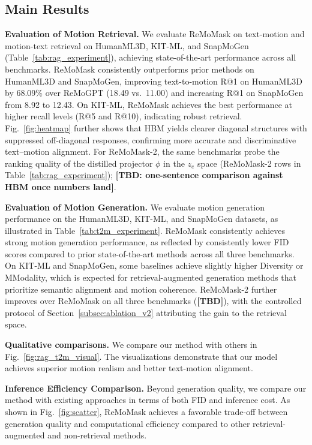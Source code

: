 \documentclass[10pt,journal,compsoc]{IEEEtran}
\newcommand{\myparagraph}[1]{\textbf{#1}\hspace{1.8ex}}
\begin{document}
\subsection{Main Results}
\noindent \myparagraph{Evaluation of Motion Retrieval.}
We evaluate ReMoMask on text-motion and motion-text retrieval on HumanML3D, KIT-ML, and SnapMoGen (Table~\ref{tab:rag_experiment}), achieving state-of-the-art performance across all benchmarks.
ReMoMask consistently outperforms prior methods on HumanML3D and SnapMoGen, improving text-to-motion R@1 on HumanML3D by 68.09\% over ReMoGPT (18.49 vs.~11.00) and increasing R@1 on SnapMoGen from 8.92 to 12.43. On KIT-ML, ReMoMask achieves the best performance at higher recall levels (R@5 and R@10), indicating robust retrieval.
Fig.~\ref{fig:heatmap} further shows that HBM yields clearer diagonal structures with suppressed off-diagonal responses, confirming more accurate and discriminative text–motion alignment.
For ReMoMask-2, the same benchmarks probe the ranking quality of the distilled projector $\phi$ in the $z_e$ space (ReMoMask-2 rows in Table~\ref{tab:rag_experiment}); \textbf{[TBD: one-sentence comparison against HBM once numbers land]}.

\noindent \myparagraph{Evaluation of Motion Generation.}
We evaluate motion generation performance on the HumanML3D, KIT-ML, and SnapMoGen datasets, as illustrated in Table~\ref{tab:t2m_experiment}. ReMoMask consistently achieves strong motion generation performance, as reflected by consistently lower FID scores compared to prior state-of-the-art methods across all three benchmarks. On KIT-ML and SnapMoGen, some baselines achieve slightly higher Diversity or MModality, which is expected for retrieval-augmented generation methods that prioritize semantic alignment and motion coherence.
ReMoMask-2 further improves over ReMoMask on all three benchmarks (\textbf{[TBD]}), with the controlled protocol of Section~\ref{subsec:ablation_v2} attributing the gain to the retrieval space.

\noindent \myparagraph{Qualitative comparisons.}
We compare our method with others in Fig.~\ref{fig:rag_t2m_visual}. The visualizations demonstrate that our model achieves superior motion realism and better text-motion alignment.





\textbf{Inference Efficiency Comparison.}
Beyond generation quality, we compare our method with existing approaches in terms of both FID and inference cost. As shown in Fig.~\ref{fig:scatter}, ReMoMask achieves a favorable trade-off between generation quality and computational efficiency compared to other retrieval-augmented and non-retrieval methods.
\end{document}
